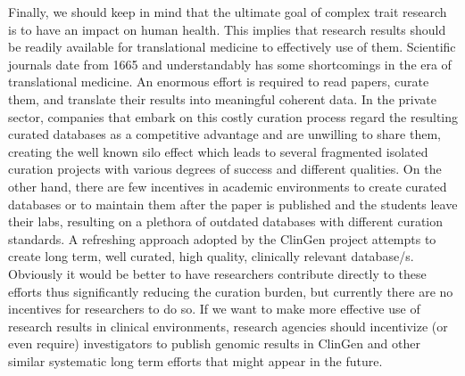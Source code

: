 Finally, we should keep in mind that the ultimate goal of complex trait research is to have an impact on human health.
This implies that research results should be readily available for translational medicine to effectively use of them.
Scientific journals date from 1665 \cite{REF} and understandably has some shortcomings in the era of translational medicine.
An enormous effort is required to read papers, curate them, and translate their results into meaningful coherent data.
In the private sector, companies that embark on this costly curation process regard the resulting curated databases as a competitive advantage and are unwilling to share them, creating the well known silo effect which leads to several fragmented isolated curation projects with various degrees of success and different qualities.
On the other hand, there are few incentives in academic environments to create curated databases or to maintain them after the paper is published and the students leave their labs, resulting on a plethora of outdated databases with different curation standards.
A refreshing approach adopted by the ClinGen project attempts to create long term, well curated, high quality, clinically relevant database/s.
Obviously it would be better to have researchers contribute directly to these efforts thus significantly reducing the curation burden, but currently there are no incentives for researchers to do so.
If we want to make more effective use of research results in clinical environments, research agencies should incentivize (or even require) investigators to publish genomic results in ClinGen and other similar systematic long term efforts that might appear in the future.

